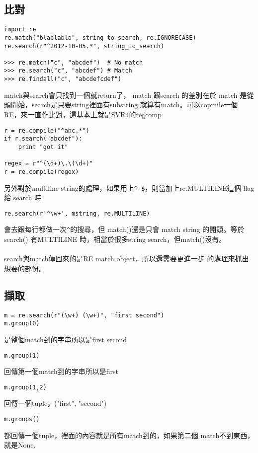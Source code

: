 \subsection{比對}
\begin{verbatim}
import re
re.match("blablabla", string_to_search, re.IGNORECASE)
re.search(r"^2012-10-05.*", string_to_search)

>>> re.match("c", "abcdef")  # No match
>>> re.search("c", "abcdef") # Match
>>> re.findall("c", "abcdefcdef")
\end{verbatim}
match與search會只找到一個就return了，
match 跟search 的差別在於 match 是從頭開始，search是只要string裡面有substring
就算有match。可以copmile一個RE，來一直作比對，這基本上就是SVR4的regcomp
\begin{verbatim}
r = re.compile("^abc.*")
if r.search("abcdef"):
    print "got it"

regex = r"^(\d+)\.\(\d+)"
r = re.compile(regex)
\end{verbatim}
另外對於multiline string的處理，如果用上\verb=^ $=，則當加上re.MULTILINE這個
flag 給 search 時
\begin{verbatim}
re.search(r'^\w+', mstring, re.MULTILINE)
\end{verbatim}
會去跟每行都做一次\verb=^=的搜尋，但 match()還是只會 match string 的開頭。等於
search() 有MULTILINE 時，相當於很多string search，但match()沒有。
\\\\
search與match傳回來的是RE match object，所以還需要更進一步
的處理來抓出想要的部份。

\subsection{擷取}
\begin{verbatim}
m = re.search(r"(\w+) (\w+)", "first second")
m.group(0)
\end{verbatim}
是整個match到的字串所以是first second
\begin{verbatim}
m.group(1)
\end{verbatim}
回傳第一個match到的字串所以是first
\begin{verbatim}
m.group(1,2)
\end{verbatim}
回傳一個tuple，("first", "second")
\begin{verbatim}
m.groups()
\end{verbatim}
都回傳一個tuple，裡面的內容就是所有match到的，如果第二個
match不到東西，就是None.

